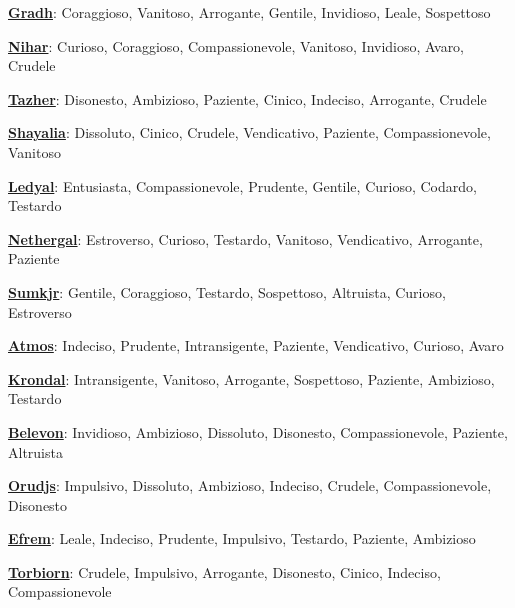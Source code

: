\begin{multicols}{2}
{\smallskip

\textbf{\hyperlink{gradh}{Gradh}}: Coraggioso, Vanitoso, Arrogante, Gentile, Invidioso, Leale, Sospettoso

\smallskip

\textbf{\hyperlink{nihar}{Nihar}}: Curioso, Coraggioso, Compassionevole, Vanitoso, Invidioso, Avaro, Crudele

\smallskip

\textbf{\hyperlink{tazher}{Tazher}}: Disonesto, Ambizioso, Paziente, Cinico, Indeciso, Arrogante, Crudele

\smallskip

\textbf{\hyperlink{shayalia}{Shayalia}}: Dissoluto, Cinico, Crudele, Vendicativo, Paziente, Compassionevole, Vanitoso

\smallskip

\textbf{\hyperlink{ledyal}{Ledyal}}: Entusiasta, Compassionevole, Prudente, Gentile, Curioso, Codardo, Testardo

\smallskip

\textbf{\hyperlink{nethergal}{Nethergal}}: Estroverso, Curioso, Testardo, Vanitoso, Vendicativo, Arrogante, Paziente

\smallskip

\textbf{\hyperlink{sumkjr}{Sumkjr}}: Gentile, Coraggioso, Testardo, Sospettoso, Altruista, Curioso, Estroverso

\smallskip

\textbf{\hyperlink{atmos}{Atmos}}: Indeciso, Prudente, Intransigente, Paziente, Vendicativo, Curioso, Avaro

\smallskip

\textbf{\hyperlink{krondal}{Krondal}}: Intransigente, Vanitoso, Arrogante, Sospettoso, Paziente, Ambizioso, Testardo

\smallskip

\textbf{\hyperlink{belevon}{Belevon}}: Invidioso, Ambizioso, Dissoluto, Disonesto, Compassionevole, Paziente, Altruista

\smallskip

\textbf{\hyperlink{orudjs}{Orudjs}}: Impulsivo, Dissoluto, Ambizioso, Indeciso, Crudele, Compassionevole, Disonesto

\smallskip

\textbf{\hyperlink{efrem}{Efrem}}: Leale, Indeciso, Prudente, Impulsivo, Testardo, Paziente, Ambizioso

\smallskip

\textbf{\hyperlink{torbiorn}{Torbiorn}}: Crudele, Impulsivo, Arrogante, Disonesto, Cinico, Indeciso, Compassionevole

}
\end{multicols}
